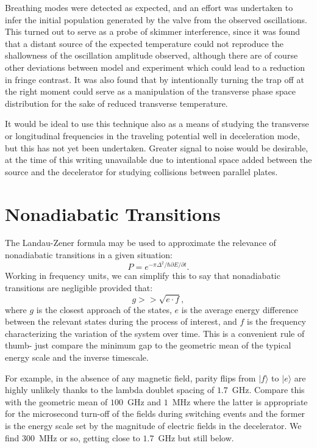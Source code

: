 Breathing modes were detected as expected, and an effort was undertaken to infer the initial population generated by the valve from the observed oscillations.
This turned out to serve as a probe of skimmer interference, since it was found that a distant source of the expected temperature could not reproduce the shallowness of the oscillation amplitude observed, although there are of course other deviations between model and experiment which could lead to a reduction in fringe contrast.
It was also found that by intentionally turning the trap off at the right moment could serve as a manipulation of the transverse phase space distribution for the sake of reduced transverse temperature.

It would be ideal to use this technique also as a means of studying the transverse or longitudinal frequencies in the traveling potential well in deceleration mode, but this has not yet been undertaken. 
Greater signal to noise would be desirable, at the time of this writing unavailable due to intentional space added between the source and the decelerator for studying collisions between parallel plates.

\section{Nonadiabatic Transitions}\label{sec:spinflipdecel}

The Landau-Zener formula may be used to approximate the relevance of nonadiabatic transitions in a given situation:
\begin{equation}
P=e^{-\pi\Delta^2/\hbar\partial E/\partial t}.
\end{equation}
Working in frequency units, we can simplify this to say that nonadiabatic transitions are negligible provided that:
\begin{equation}
g >> \sqrt{e\cdot f},
\end{equation}
where $g$ is the closest approach of the states, $e$ is the average energy difference between the relevant states during the process of interest, and $f$ is the frequency characterizing the variation of the system over time.
This is a convenient rule of thumb- just compare the minimum gap to the geometric mean of the typical energy scale and the inverse timescale.

For example, in the absence of any magnetic field, parity flips from $|f\rangle$ to $|e\rangle$ are highly unlikely thanks to the lambda doublet spacing of $1.7$~GHz.
Compare this with the geometric mean of $100$~GHz and $1$~MHz where the latter is appropriate for the microsecond turn-off of the fields during switching events and the former is the energy scale set by the magnitude of electric fields in the decelerator.
We find $300$~MHz or so, getting close to $1.7$~GHz but still below.

